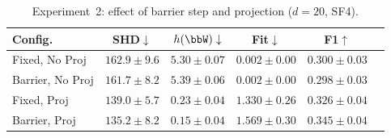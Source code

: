 \documentclass[conference]{IEEEtran}
\begin{document}
    \begin{table}[ht]
      \centering
      \caption{Experiment~2: effect of barrier step and projection
               ($d=20$, SF4).}
      \label{tab:exp2}
      \scriptsize
      \setlength{\tabcolsep}{2pt}
      \renewcommand{\arraystretch}{0.95}
      \begin{tabular}{lccccr}
        \toprule
        Config. & SHD$\downarrow$ & $h(\bbW)\downarrow$ & Fit$\downarrow$ & F1$\uparrow$ \\
        \midrule
        Fixed, No Proj   & $162.9\pm9.6$  & $5.30\pm0.07$  & $\mathbf{0.002}\pm0.00$ & $0.300\pm0.03$ \\
        Barrier, No Proj & $161.7\pm8.2$  & $5.39\pm0.06$  & $\mathbf{0.002}\pm0.00$ & $0.298\pm0.03$ \\
        Fixed, Proj      & $139.0\pm5.7$  & $0.23\pm0.04$  & $1.330\pm0.26$          & $0.326\pm0.04$ \\
        Barrier, Proj    & ${\mathbf{135.2}\pm8.2}$ & ${\mathbf{0.15}\pm0.04}$ & ${1.569\pm0.30}$ & ${\mathbf{0.345}\pm0.04}$ \\
        \bottomrule
      \end{tabular}
    \end{table}

    

    

\end{document}
